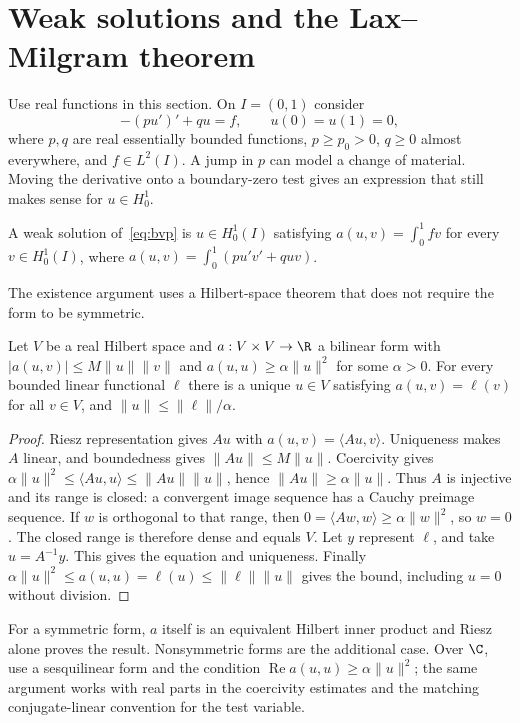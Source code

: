 \section{Weak solutions and the Lax--Milgram theorem}

Use real functions in this section. On $I=(0,1)$ consider
\begin{equation}\label{eq:bvp}
-(pu')'+qu=f,\qquad u(0)=u(1)=0,
\end{equation}
where $p,q$ are real essentially bounded functions, $p\ge p_0>0$, $q\ge0$ almost everywhere, and $f\in L^2(I)$. A jump in $p$ can model a change of material. Moving the derivative onto a boundary-zero test gives an expression that still makes sense for $u\in H^1_0$.

\begin{definition}
A weak solution of~\eqref{eq:bvp} is $u\in H^1_0(I)$ satisfying $a(u,v)=\int_0^1fv$ for every $v\in H^1_0(I)$, where
$a(u,v)=\int_0^1(pu'v'+quv)$.
\end{definition}

The existence argument uses a Hilbert-space theorem that does not require the form to be symmetric.

\begin{theorem}\label{thm:laxmilgram}
Let $V$ be a real Hilbert space and $a:V\times V\to\R$ a bilinear form with
$|a(u,v)|\le M\|u\|\|v\|$ and $a(u,u)\ge\alpha\|u\|^2$ for some $\alpha>0$. For every bounded linear functional $\ell$ there is a unique $u\in V$ satisfying $a(u,v)=\ell(v)$ for all $v\in V$, and
$\|u\|\le\|\ell\|/\alpha$.
\end{theorem}
\begin{proof}
Riesz representation gives $Au$ with $a(u,v)=\langle Au,v\rangle$. Uniqueness makes $A$ linear, and boundedness gives $\|Au\|\le M\|u\|$. Coercivity gives $\alpha\|u\|^2\le\langle Au,u\rangle\le\|Au\|\|u\|$, hence $\|Au\|\ge\alpha\|u\|$. Thus $A$ is injective and its range is closed: a convergent image sequence has a Cauchy preimage sequence. If $w$ is orthogonal to that range, then $0=\langle Aw,w\rangle\ge\alpha\|w\|^2$, so $w=0$. The closed range is therefore dense and equals $V$.
Let $y$ represent $\ell$, and take $u=A^{-1}y$. This gives the equation and uniqueness. Finally $\alpha\|u\|^2\le a(u,u)=\ell(u)\le\|\ell\|\|u\|$ gives the bound, including $u=0$ without division.
\end{proof}

For a symmetric form, $a$ itself is an equivalent Hilbert inner product and Riesz alone proves the result. Nonsymmetric forms are the additional case. Over $\C$, use a sesquilinear form and the condition $\operatorname{Re}a(u,u)\ge\alpha\|u\|^2$; the same argument works with real parts in the coercivity estimates and the matching conjugate-linear convention for the test variable.

